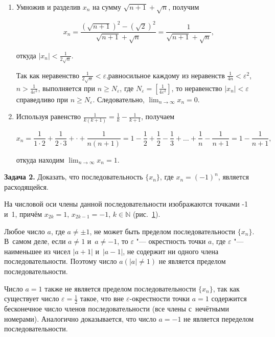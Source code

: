 \begin{enumerate}
\item Умножив и разделив $x_{n}$ на сумму $\sqrt{n + 1} + \sqrt{n}$,
получим

\begin{equation*}
\displaystyle x_{n} =
\frac{\left( \sqrt{n+1} \right)^{2}- \left( \sqrt{2} \right)^{2}}{\sqrt{n+1} + \sqrt{n}} =
\frac{1}{\sqrt{n+1} + \sqrt{n}},
\end{equation*}

\noindent
откуда $\displaystyle |x_{n}| < \frac{1}{2\sqrt{n}}$.

Так как неравенство $\displaystyle \frac{1}{2\sqrt{n}} < \varepsilon$,равносильное
каждому из неравенств
$\displaystyle \frac{1}{4n} < \varepsilon^{2}$, 
$\displaystyle n > \frac{1}{4\varepsilon^{2}}$,
выполняется при $n \geqslant N_{\varepsilon}$,
где $\displaystyle N_{\varepsilon} = \left[ \frac{1}{4\varepsilon^{2}} \right]$,
то неравенство $|x_{n}| < \varepsilon$ справедливо при $n \geqslant N_{\varepsilon}$.
Следовательно, $\displaystyle \lim_{n \to \infty} x_{n} = 0$.

\item Используя равенство
$\displaystyle \frac{1}{k(k+1)} = \frac{1}{k} - \frac{1}{k+1}$,
получаем

\begin{equation*}
\displaystyle
x_{n} =
\frac{1}{1 \cdot 2} + \frac{1}{2 \cdot 3} + \cdot + \frac{1}{n(n+1)} =
1 - \frac{1}{2} + \frac{1}{2} - \frac{1}{3} + \dots + \frac{1}{n} - \frac{1}{n+1} =
1 - \frac{1}{n+1},
\end{equation*}

\noindent
откуда находим $\displaystyle \lim_{n \to \infty} x_{n} = 1$.

\end{enumerate}

\textbf{Задача 2.}\label{ex:3_1_3_2}
Доказать, что последовательность $\{x_{n}\}$, где $x_{n} = (-1)^{n}$, является расходящейся.

На числовой оси члены данной последовательности изображаются точками -1 и~1,
причём $x_{2k} = 1$, $x_{2k-1} = -1$, $k \in \mathbb{N}$ (рис.\ \ref{fig:3_1_3_3}).

\begin{figure}\label{fig:3_1_3_3}
\end{figure}

Любое число $a$, где $a \ne \pm 1$, не может быть пределом последовательности $\{x_{n}\}$.
В~самом деле, если $a \ne 1$ и~$a \ne -1$, то $\varepsilon$ "--- окрестность точки $a$,
где $\varepsilon$ "--- наименьшее из чисел $|a + 1|$ и~$|a - 1|$, не содержит
ни одного члена последовательности. Поэтому число $a(|a| \ne 1)$ не является
пределом последовательности.

Число $a = 1$ также не является пределом последовательности $\{x_{n}\}$,
так как существует число $\displaystyle \varepsilon = \frac{1}{2}$ такое,
что вне $\varepsilon$-окрестности точки $a = 1$ содержится бесконечное число 
членов последовательности (все члены с~нечётными номерами).
Аналогично доказывается, что число $a = -1$ не является переделом последовательности.


